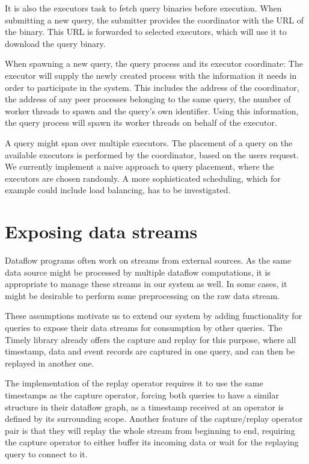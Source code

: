 It is also the executors task to fetch query binaries before execution. When
submitting a new query, the submitter provides the coordinator with the URL of
the binary. This URL is forwarded to selected executors, which will use it to
download the query binary.

When spawning a new query, the query process and its executor coordinate:
The executor will supply the newly created process with the information
it needs in order to participate in the system. This includes
the address of the coordinator, the address of any peer processes belonging to the 
same query, the number of worker threads to spawn and the query's own identifier.
Using this information, the query process will spawn its worker threads on behalf
of the executor.

A query might span over multiple executors. The placement of a query on the
available executors is performed by the coordinator, based on the users request.
We currently implement a naive approach to query placement, where the executors
are chosen randomly. A more sophisticated scheduling, which for example could
include load balancing, has to be investigated.


\section{Exposing data streams}

Dataflow programs often work on streams from external sources. As the same
data source might be processed by multiple dataflow computations, it is
appropriate to manage these streams in our system as well. In some cases, it
might be desirable to perform some preprocessing on the raw data stream.

These assumptions motivate us to extend our system by adding functionality
for queries to expose their data streams for consumption by other queries.
The Timely library already offers the capture and replay for this purpose, where
all timestamp, data and event records are captured in one query, and can then
be replayed in another one.

The implementation of the replay operator requires it to use the same timestamps
as the capture operator, forcing both queries to have a similar structure
in their dataflow graph, as a timestamp received at an operator is defined
by its surrounding scope. Another feature of the capture/replay operator pair
is that they will replay the whole stream from beginning to end, requiring the
capture operator to either buffer its incoming data or wait for the replaying
query to connect to it.

